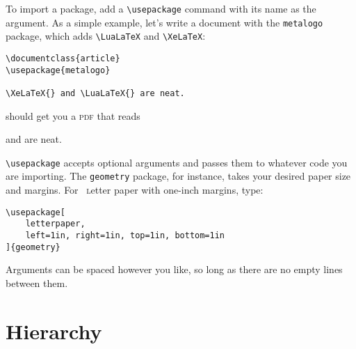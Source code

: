 To import a package, add a \verb|\usepackage| command
with its name as the argument.
As a simple example, let's write a document with the \texttt{metalogo}
package, which adds \verb|\LuaLaTeX| and \verb|\XeLaTeX|:
\begin{leftfigure}
\begin{lstlisting}
\documentclass{article}
\usepackage{metalogo}

\XeLaTeX{} and \LuaLaTeX{} are neat.

\end{lstlisting}
\end{leftfigure}
\begin{samepage}
should get you a \textsc{pdf} that reads
\begin{leftfigure}
\lm \XeLaTeX{} and \LuaLaTeX{} are neat.
\end{leftfigure}
\end{samepage}
\verb|\usepackage| accepts optional arguments
and passes them to whatever code you are importing.
The \texttt{geometry} package, for instance,
takes your desired paper size and margins.
For ~\textsc{l}etter paper with one-inch margins,
type:
\begin{leftfigure}
\begin{lstlisting}
\usepackage[
    letterpaper,
    left=1in, right=1in, top=1in, bottom=1in
]{geometry}
\end{lstlisting}
\end{leftfigure}
Arguments can be spaced however you like,
so long as there are no empty lines between them.

\section{Hierarchy}

